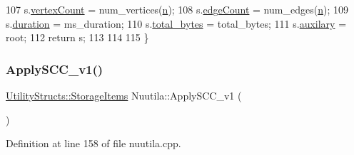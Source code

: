 \begin{DoxyCode}
107     s.\hyperlink{struct_utility_structs_1_1_storage_items_af72522be713f23fcfe3ac66780183fda}{vertexCount} = num\_vertices(\hyperlink{class_nuutila_a1409929fa0f38709497f8bdb012af71c}{n});
108     s.\hyperlink{struct_utility_structs_1_1_storage_items_afafcba9bb103108e2c1e1d9254fb75c5}{edgeCount} = num\_edges(\hyperlink{class_nuutila_a1409929fa0f38709497f8bdb012af71c}{n});
109     s.\hyperlink{struct_utility_structs_1_1_storage_items_a65e7df5611a4e144cc27576bd3041f6c}{duration} = ms\_duration;
110     s.\hyperlink{struct_utility_structs_1_1_storage_items_a39cf482db54d8e6ac473b438444c8a1e}{total\_bytes} = total\_bytes;
111     s.\hyperlink{struct_utility_structs_1_1_storage_items_afb9d346eaacb1c5e7f60f559c45910f2}{auxilary} = root;
112     \textcolor{keywordflow}{return} s;
113 
114     
115 \}
\end{DoxyCode}
\mbox{\label{class_nuutila_a6c355594f68dad8c28684114a6df6700}} 
\subsubsection{\texorpdfstring{Apply\+S\+C\+C\+\_\+v1()}{ApplySCC\_v1()}}
{\footnotesize\ttfamily \hyperlink{struct_utility_structs_1_1_storage_items}{Utility\+Structs\+::\+Storage\+Items} Nuutila\+::\+Apply\+S\+C\+C\+\_\+v1 (\begin{DoxyParamCaption}{ }\end{DoxyParamCaption})}



Definition at line 158 of file nuutila.\+cpp.


